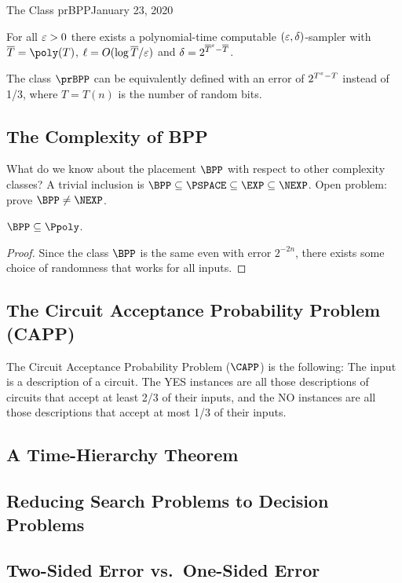 \begin{lecture}{1}{The Class prBPP}{January 23, 2020}
\begin{theorem}
  For all $\varepsilon > 0$ there exists a polynomial-time computable $(\varepsilon,
  \delta)$-sampler with $\overline{T} = \poly(T)$, $\ell = O(\log
  \overline{T}/\varepsilon)$ and $\delta = 2^{\overline{T}^\varepsilon - \overline{T}}$.
\end{theorem}

\begin{corollary}
  The class $\prBPP$ can be equivalently defined with an error of $2^{T^\varepsilon -
  T}$ instead of 1/3, where $T = T(n)$ is the number of random bits.
\end{corollary}

\subsection{The Complexity of BPP}

What do we know about the placement $\BPP$ with respect to other complexity
classes? A trivial inclusion is $\BPP \subseteq \PSPACE \subseteq \EXP
\subseteq \NEXP$. Open problem: prove $\BPP \ne \NEXP$.

\begin{theorem}
  $\BPP \subseteq \Ppoly$.
\end{theorem}

\begin{proof}
  Since the class $\BPP$ is the same even with error $2^{-2n}$, there exists
  some choice of randomness that works for all inputs.
\end{proof}

\subsection{The Circuit Acceptance Probability Problem (CAPP)}

\begin{definition}
  The Circuit Acceptance Probability Problem ($\CAPP$) is the following: The input
  is a description of a circuit. The YES instances are all those descriptions
  of circuits that accept at least 2/3 of their inputs, and the NO instances
  are all those descriptions that accept at most 1/3 of their inputs.
\end{definition}

\subsection{A Time-Hierarchy Theorem}

\subsection{Reducing Search Problems to Decision Problems}

\subsection{Two-Sided Error vs.\ One-Sided Error}

\end{lecture}
